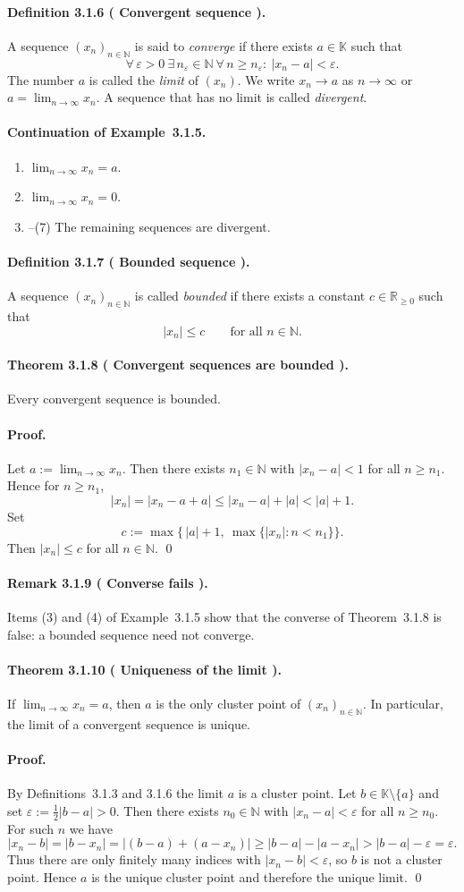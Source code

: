 \documentclass[12pt,a4paper]{article}
\newcommand{\N}{\mathbb{N}}
\newcommand{\R}{\mathbb{R}}
\newcommand{\K}{\mathbb{K}} %
\newcommand{\eps}{\varepsilon}
\newcommand{\NumberedDefinition}[3]{%
\paragraph*{Definition #1 ( #2 ).} #3\par}
\newcommand{\NumberedTheorem}[3]{%
\paragraph*{Theorem #1 ( #2 ).} #3\par}
\newcommand{\NumberedRemark}[3]{%
\paragraph*{Remark #1 ( #2 ).} #3\par}
\theoremstyle{plain}
\theoremstyle{definition}
\theoremstyle{remark}
\begin{document}
\NumberedDefinition{3.1.6}{Convergent sequence}{A sequence $(x_n)_{n\in\N}$ is said to \emph{converge} if there exists $a\in\K$ such that
\[
	\forall\,\eps>0\ \exists\, n_\eps\in\N\ \forall\, n\ge n_\eps:\ |x_n-a|<\eps.
\]
The number $a$ is called the \emph{limit} of $(x_n)$. We write $x_n\to a$ as $n\to\infty$ or $a=\lim_{n\to\infty} x_n$. A sequence that has no limit is called \emph{divergent}.}

\paragraph{Continuation of Example~3.1.5.}
\begin{enumerate}[label={(\arabic*)}, leftmargin=*]
	\item $\lim_{n\to\infty} x_n=a$.
	\item $\lim_{n\to\infty} x_n=0$.
	\item--(7) The remaining sequences are divergent.
\end{enumerate}

\NumberedDefinition{3.1.7}{Bounded sequence}{A sequence $(x_n)_{n\in\N}$ is called \emph{bounded} if there exists a constant $c\in\R_{\ge 0}$ such that
\[
	|x_n|\le c \qquad \text{for all } n\in\N.
\]}

\NumberedTheorem{3.1.8}{Convergent sequences are bounded}{Every convergent sequence is bounded.}

\paragraph{Proof.} Let $a:=\lim_{n\to\infty} x_n$. Then there exists $n_1\in\N$ with $|x_n-a|<1$ for all $n\ge n_1$. Hence for $n\ge n_1$,
\[
	|x_n| = |x_n-a+a| \le |x_n-a| + |a| < |a|+1.
\]
Set
\[
	c := \max\big\{\, |a|+1,\ \max\{ |x_n| : n<n_1\}\big\}.
\]
Then $|x_n|\le c$ for all $n\in\N$. \qed

\NumberedRemark{3.1.9}{Converse fails}{Items (3) and (4) of Example~3.1.5 show that the converse of Theorem~3.1.8 is false: a bounded sequence need not converge.}

\NumberedTheorem{3.1.10}{Uniqueness of the limit}{If $\lim_{n\to\infty} x_n = a$, then $a$ is the only cluster point of $(x_n)_{n\in\N}$. In particular, the limit of a convergent sequence is unique.}

\paragraph{Proof.} By Definitions~3.1.3 and 3.1.6 the limit $a$ is a cluster point. Let $b\in\K\setminus\{a\}$ and set $\eps := \tfrac12 |b-a|>0$. Then there exists $n_0\in\N$ with $|x_n-a|<\eps$ for all $n\ge n_0$. For such $n$ we have
\[
	|x_n-b| = |b-x_n| = |(b-a)+(a-x_n)| \ge |b-a| - |a-x_n| > |b-a|-\eps = \eps.
\]
Thus there are only finitely many indices with $|x_n-b|<\eps$, so $b$ is not a cluster point. Hence $a$ is the unique cluster point and therefore the unique limit. \qed
\end{document}
